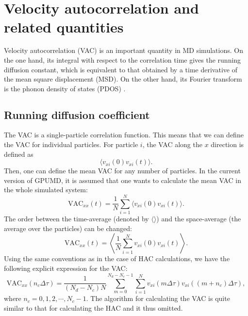 \documentclass[12pt,a4paper]{report}
\begin{document}
\section{Velocity autocorrelation and related quantities}

Velocity autocorrelation (VAC) is an important quantity in MD simulations. On the one hand, its integral with respect to the correlation time gives the running diffusion constant, which is equivalent to that obtained by a time derivative of the mean square displacement (MSD). On the other hand, its Fourier transform is the phonon density of states (PDOS) \cite{dickey1969pr}.

\subsection{Running diffusion coefficient}

The VAC is a single-particle correlation function. This means that we can define the VAC for individual particles. For particle $i$, the VAC along the $x$ direction is defined as
\begin{equation}
\langle v_{xi}(0) v_{xi}(t) \rangle.
\end{equation}
Then, one can define the mean VAC for any number of particles. In the current version of GPUMD, it is assumed that one wants to calculate the mean VAC in the whole simulated system:
\begin{equation}
\boxed{
\text{VAC}_{xx}(t) =
\frac{1}{N} \sum_{i=1}^{N} \langle v_{xi}(0) v_{xi}(t) \rangle
}.
\end{equation}
The order between the time-average (denoted by $\langle \rangle$) and the space-average (the average over the particles) can be changed:
\begin{equation}
\boxed{
\text{VAC}_{xx}(t) =
\left\langle \frac{1}{N} \sum_{i=1}^{N}  v_{xi}(0) v_{xi}(t) \right\rangle
}.
\end{equation}
Using the same conventions as in the case of HAC calculations, we have
the following explicit expression for the VAC:
\begin{equation}
\label{equation:VAC}
\text{VAC}_{xx}(n_c\Delta \tau) = \frac{1}{(N_d-N_c)N}
\sum_{m=0}^{N_d-N_c-1} \sum_{i=1}^{N}
v_{xi}(m\Delta \tau) v_{xi}((m+n_c)\Delta \tau),
\end{equation}
where $n_c = 0, 1, 2, \cdots, N_c-1$.
The algorithm for calculating the VAC is quite similar to that for calculating the HAC and it thus omitted.
\end{document}

